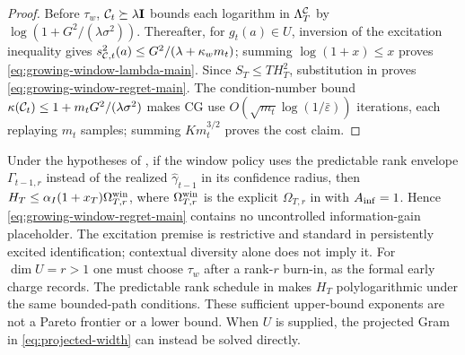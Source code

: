 \begin{proof}
Before $\tau_w$, $\mathcal{C}_t\succeq\lambda\mathbf{I}$ bounds each logarithm in
$\Lambda^{\mathcal{C}}_T$ by $\log(1+G^2/(\lambda\sigma^2))$.  Thereafter, for
$g_t(a)\in U$, inversion of the excitation inequality gives
$s_{\mathcal{C},t}^2(a)\le G^2/(\lambda+\kappa_wm_t)$; summing
$\log(1+x)\le x$ proves \eqref{eq:growing-window-lambda-main}.  Since
$S_T\le TH_T^2$, substitution in  proves
\eqref{eq:growing-window-regret-main}.  The condition-number bound
$\kappa(\mathcal{C}_t)\le1+m_tG^2/(\lambda\sigma^2)$ makes CG use
$O(\sqrt{m_t}\log(1/\bar\varepsilon))$ iterations, each replaying $m_t$
samples; summing $Km_t^{3/2}$ proves the cost claim.
\end{proof}
Under the hypotheses of , if the window policy uses
the predictable rank envelope $\Gamma_{t-1,r}$ instead of the realized
$\hat\gamma_{t-1}$ in its confidence radius, then
$H_T\le\alpha_I(1+x_T)\Omega^{\rm win}_{T,r}$, where
$\Omega^{\rm win}_{T,r}$ is the explicit $\Omega_{T,r}$ in
 with $A_{\rm inf}=1$.  Hence
\eqref{eq:growing-window-regret-main} contains no uncontrolled information-gain
placeholder.  The excitation premise is restrictive and standard in persistently excited
identification; contextual diversity alone does not imply it.  For $\dim U=r>1$
one must choose $\tau_w$ after a rank-$r$ burn-in, as the formal early charge
records.  The predictable rank schedule in
 makes $H_T$ polylogarithmic under the same bounded-path
conditions.  These sufficient upper-bound exponents are not a Pareto frontier
or a lower bound.  When $U$ is supplied, the projected Gram in
\eqref{eq:projected-width} can instead be solved directly.
